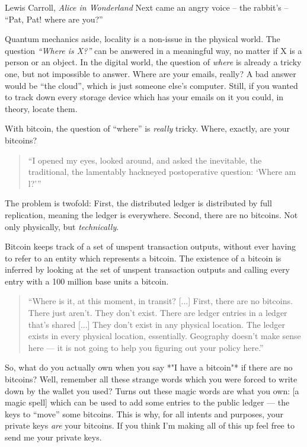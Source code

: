 \label{les:3}

\begin{chapquote}{Lewis Carroll, \textit{Alice in Wonderland}}
Next came an angry voice -- the rabbit's -- ``Pat, Pat! where are you?''
\end{chapquote}

Quantum mechanics aside, locality is a non-issue in the physical world.
The question \textit{``Where is X?''} can be answered in a meaningful way, no
matter if X is a person or an object. In the digital world, the question
of \textit{where} is already a tricky one, but not impossible to answer. Where
are your emails, really? A bad answer would be ``the cloud'', which is
just someone else's computer. Still, if you wanted to track down every
storage device which has your emails on it you could, in theory, locate
them.

With bitcoin, the question of ``where'' is \textit{really} tricky. Where,
exactly, are your bitcoins?

\begin{quotation}
``I opened my eyes, looked around, and asked the inevitable, the
traditional, the lamentably hackneyed postoperative question: `Where
am l?'''
\end{quotation}

The problem is twofold: First, the distributed ledger is distributed by
full replication, meaning the ledger is everywhere. Second, there are no
bitcoins. Not only physically, but \textit{technically}.

Bitcoin keeps track of a set of unspent transaction outputs, without
ever having to refer to an entity which represents a bitcoin. The
existence of a bitcoin is inferred by looking at the set of unspent
transaction outputs and calling every entry with a 100 million base
units a bitcoin.

\begin{quotation}
``Where is it, at this moment, in transit? [...] First, there are no
bitcoins. There just aren't. They don't exist. There are ledger
entries in a ledger that's shared [...] They don't exist in any
physical location. The ledger exists in every physical location,
essentially. Geography doesn't make sense here --- it is not going to
help you figuring out your policy here.''\cite{wbd049}
\end{quotation}

So, what do you actually own when you say *"I have a bitcoin"* if there
are no bitcoins? Well, remember all these strange words which you were
forced to write down by the wallet you used? Turns out these magic words
are what you own: [a magic spell] which can be used to add some entries
to the public ledger --- the keys to ``move'' some bitcoins. This is why,
for all intents and purposes, your private keys \textit{are} your bitcoins. If
you think I'm making all of this up feel free to send me your private
keys.

